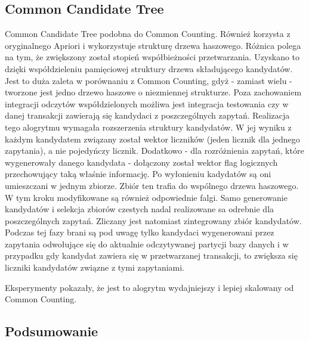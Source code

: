 \subsection{Common Candidate Tree \cite{WojciechowskiCCT}}
\label{c326}
Common Candidate Tree podobna do Common Counting. Również korzysta z oryginalnego Apriori i wykorzystuje strukturę drzewa haszowego. Różnica polega na tym, że zwiększony został stopień współbieżności przetwarzania. Uzyskano to dzięki współdzieleniu pamięciowej struktury drzewa składującego kandydatów. Jest to duża zaleta w porównaniu z Common Counting, gdyż - zamiast wielu - tworzone jest jedno drzewo haszowe o niezmiennej strukturze. Poza zachowaniem integracji odczytów współdzielonych możliwa jest integracja testowania czy w danej transakcji zawierają się kandydaci z poszczególnych zapytań. Realizacja tego alogrytmu wymagała rozszerzenia struktury kandydatów. W jej wyniku z każdym kandydatem związany został wektor liczników (jeden licznik dla jednego zapytania), a nie pojedyńczy licznik. Dodatkowo - dla rozróżnienia zapytań, które wygenerowały danego kandydata - dołączony został wektor flag logicznych przechowujący taką właśnie informację. Po wyłonieniu kadydatów są oni umieszczani w jednym zbiorze. Zbiór ten trafia do wspólnego drzewa haszowego. W tym kroku modyfikowane są również odpowiednie falgi. Samo generowanie kandydatów i selekcja zbiorów czestych nadal realizowane sa odrebnie dla poszczególnych zapytań. Zliczany jest natomiast zintegrowany zbiór kandydatów. Podczas tej fazy brani są pod uwagę tylko kandydaci wygenerowani przez zapytania odwołujące się do aktualnie odczytywanej partycji bazy danych i w przypadku gdy kandydat zawiera się w przetwarzanej transakcji, to zwiększa się liczniki kandydatów związne z tymi zapytaniami.

Eksperymenty \cite{WojciechowskiCCT} pokazały, że jest to alogrytm wydajniejszy i lepiej skalowany od Common Counting.

\subsection{Podsumowanie}
\label{c327}